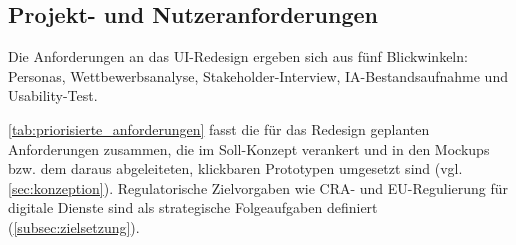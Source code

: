 \vfill

\subsection{Projekt- und Nutzeranforderungen}\label{sec:anforderungssynthese}

Die Anforderungen an das UI-Redesign ergeben sich aus fünf Blickwinkeln: Personas, Wettbewerbsanalyse, Stakeholder-Interview, IA-Bestandsaufnahme und Usability-Test.

\autoref{tab:priorisierte_anforderungen} fasst die für das Redesign geplanten Anforderungen zusammen, die im Soll-Konzept verankert und in den Mockups bzw. dem daraus abgeleiteten, klickbaren Prototypen umgesetzt sind (vgl. \autoref{sec:konzeption}).
Regulatorische Zielvorgaben wie CRA- und EU-Regulierung für digitale Dienste sind als strategische Folgeaufgaben definiert (\autoref{subsec:zielsetzung}).

